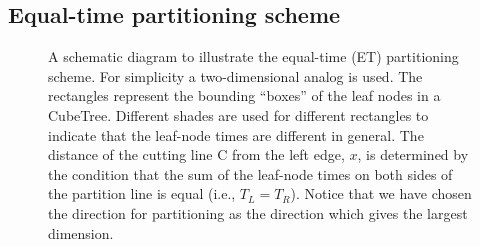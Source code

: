 \documentclass[preprint]{revtex4}
\begin{document}
\subsection{Equal-time partitioning scheme}
\label{subsec:equal-time}
\begin{figure}[t]
\caption{A schematic diagram to illustrate the equal-time (ET) partitioning
scheme.  For simplicity a two-dimensional analog is used. The
rectangles represent the bounding ``boxes'' of the leaf nodes in a
CubeTree.  Different shades are used for different rectangles to indicate
that the leaf-node times are different in general. The distance of the
cutting line C from the left edge, $x$, is determined by the condition
that the sum of the leaf-node times on both sides of the partition line is
equal (i.e., $T_L = T_R$).  Notice that we have chosen the direction
for partitioning as the direction which gives the largest dimension.}
\label{fig:shiftline}
\end{figure}
\end{document}
